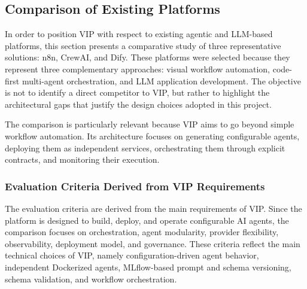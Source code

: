 \subsection{Comparison of Existing Platforms}

In order to position VIP with respect to existing agentic and LLM-based platforms, this section presents a comparative study of three representative solutions: n8n, CrewAI, and Dify. These platforms were selected because they represent three complementary approaches: visual workflow automation, code-first multi-agent orchestration, and LLM application development. The objective is not to identify a direct competitor to VIP, but rather to highlight the architectural gaps that justify the design choices adopted in this project.

The comparison is particularly relevant because VIP aims to go beyond simple workflow automation. Its architecture focuses on generating configurable agents, deploying them as independent services, orchestrating them through explicit contracts, and monitoring their execution.

\subsubsection{Evaluation Criteria Derived from VIP Requirements}

The evaluation criteria are derived from the main requirements of VIP. Since the platform is designed to build, deploy, and operate configurable AI agents, the comparison focuses on orchestration, agent modularity, provider flexibility, observability, deployment model, and governance. These criteria reflect the main technical choices of VIP, namely configuration-driven agent behavior, independent Dockerized agents, MLflow-based prompt and schema versioning, schema validation, and workflow orchestration.

